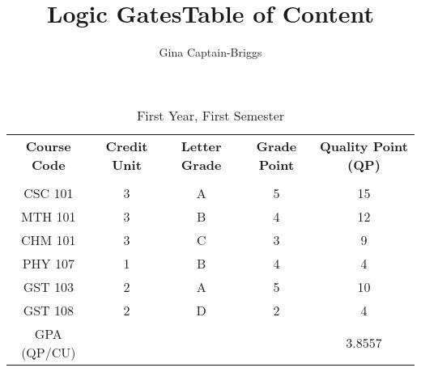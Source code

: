 \documentclass{article}
\begin{document}
	
	\title{Logic Gates}
	\author{Gina Captain-Briggs}
	\newpage
    \title{Table of Content}
    \newpage

\begin{table}[h!]
	\begin{center}
		\caption{First Year, First Semester}
		\label{tab:table1}
		\begin{tabular}{|c|S|S|S|c|}
			\textbf{Course Code} & \textbf{Credit Unit} & 
			\textbf{Letter Grade} &
			\textbf{Grade Point} &
			\textbf{Quality Point (QP)}\\
			 &  &  &  &   \\
			\hline
			CSC 101 & 3 & A & 5 & 15\\
			MTH 101 & 3 & B & 4 & 12\\
			CHM 101 & 3 & C & 3 & 9\\
			PHY 107 & 1 & B & 4 & 4\\
			GST 103 & 2 & A & 5 & 10\\
			GST 108 & 2 & {D} & 2 & 4\\
			GPA (QP/CU) &   &   &   & 3.8557\\
			\hline
		\end{tabular}
	\end{center}
\end{table}
\end{document}
